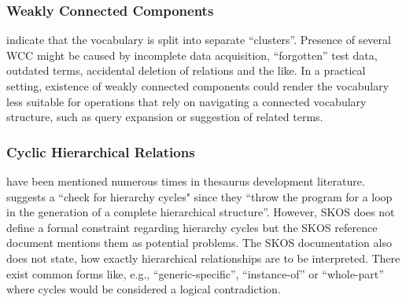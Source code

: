 


\subsubsection{Weakly Connected Components} indicate that the vocabulary is split into separate ``clusters''. Presence of several WCC might be caused by incomplete data acquisition, ``forgotten'' test data, outdated terms, accidental deletion of relations and the like. In a practical setting, existence of weakly connected components could render the vocabulary less suitable for operations that rely on navigating a connected vocabulary structure, such as query expansion or suggestion of related terms. 

 

\subsubsection{Cyclic Hierarchical Relations} have been mentioned numerous times in thesaurus development literature. \cite{Soergel2002} suggests a ``check for hierarchy cycles" since they ``throw the program for a loop in the generation of a complete hierarchical structure''. However, SKOS does not define a formal constraint regarding hierarchy cycles but the SKOS reference document mentions them as potential problems. The SKOS documentation also does not state, how exactly hierarchical relationships are to be interpreted. There exist common forms like, e.g., ``generic-specific'', ``instance-of'' or ``whole-part'' \cite{Hedden2010,Harpring2010,Aitchison2000} where cycles would be considered a logical contradiction.
 
